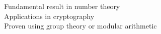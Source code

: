 \documentclass[preview]{standalone}
\begin{document}
Fundamental result in number theory\\Applications in cryptography\\Proven using group theory or modular arithmetic\\
\end{document}
